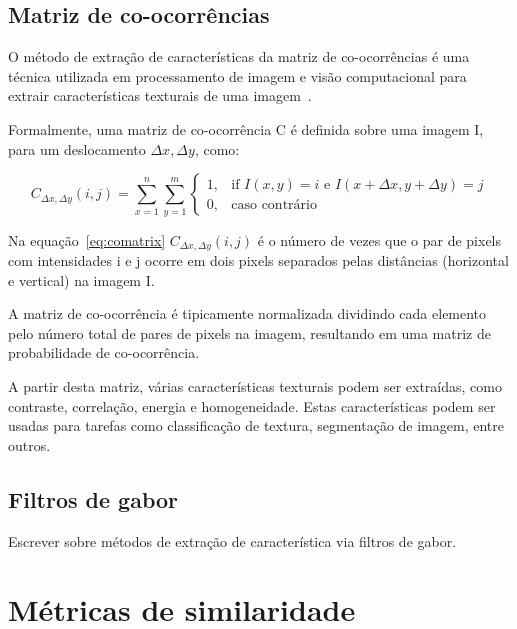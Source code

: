 \subsection{Matriz de co-ocorrências}\label{sec:teorica-matriz-co-ocorrencia}

O método de extração de características da matriz de co-ocorrências é
uma técnica utilizada em processamento de imagem e visão computacional
para extrair características texturais de uma imagem~\cite{matrizcoocorrencia2017}.

Formalmente, uma matriz de co-ocorrência C é definida sobre uma imagem
I, para um deslocamento $\Delta x, \Delta y$, como:

\begin{equation}\label{eq:comatrix}
  C_{\Delta x, \Delta y}(i,j) = \sum_{x=1}^n\sum_{y=1}^m
  \begin{cases} 1, & \text{if }I(x,y)=i\text{ e }I(x+\Delta x, y+\Delta y)=j
               \\ 0, & \text{caso contrário}
  \end{cases}
\end{equation}

Na equação~\ref{eq:comatrix} $C_{\Delta x, \Delta y}(i,j)$ é o número de vezes
que o par de pixels com intensidades i e j ocorre em dois pixels
separados pelas distâncias (horizontal e vertical) na imagem I.

A matriz de co-ocorrência é tipicamente normalizada dividindo cada
elemento pelo número total de pares de pixels na imagem, resultando em
uma matriz de probabilidade de co-ocorrência.

A partir desta matriz, várias características texturais podem ser
extraídas, como contraste, correlação, energia e homogeneidade. Estas
características podem ser usadas para tarefas como classificação de
textura, segmentação de imagem, entre outros.

\subsection{Filtros de gabor}\label{sec:filtros-gabor}

Escrever sobre métodos de extração de característica via filtros de gabor.

\section{Métricas de similaridade}\label{sec:teorica-metricas-de-similaridade}



